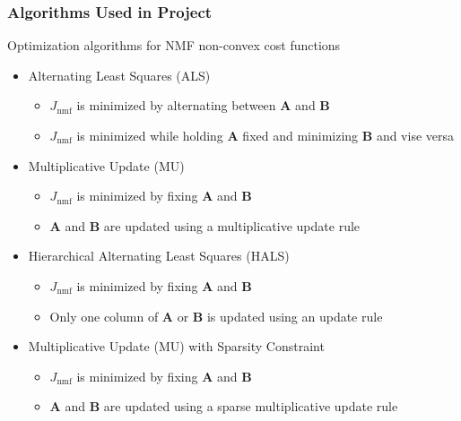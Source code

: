 \documentclass{beamer}
\begin{document}
\begin{frame}
\frametitle{Algorithms Used in Project}
Optimization algorithms for NMF non-convex cost functions

\begin{itemize}
	\item Alternating Least Squares (ALS)
		\begin{itemize}
			\item $J_{\text{nmf}}$ is minimized by alternating between $\mathbf{A}$ and $\mathbf{B}$
			\item $J_{\text{nmf}}$ is minimized while holding $\mathbf{A}$ fixed and minimizing $\mathbf{B}$ and vise versa
		\end{itemize}
	\item Multiplicative Update (MU)
		\begin{itemize}
			\item $J_{\text{nmf}}$ is minimized by fixing $\mathbf{A}$ and $\mathbf{B}$
			\item $\mathbf{A}$ and $\mathbf{B}$ are updated using a multiplicative update rule
		\end{itemize}
	\item Hierarchical Alternating Least Squares (HALS)
		\begin{itemize}
			\item $J_{\text{nmf}}$ is minimized by fixing $\mathbf{A}$ and $\mathbf{B}$
			\item Only one column of $\mathbf{A}$ or $\mathbf{B}$ is updated using an update rule
		\end{itemize}
	\item Multiplicative Update (MU) with Sparsity Constraint
		\begin{itemize}
			\item $J_{\text{nmf}}$ is minimized by fixing $\mathbf{A}$ and $\mathbf{B}$
			\item $\mathbf{A}$ and $\mathbf{B}$ are updated using a sparse multiplicative update rule
		\end{itemize}
	\end{itemize}	
\end{frame}
\end{document}

